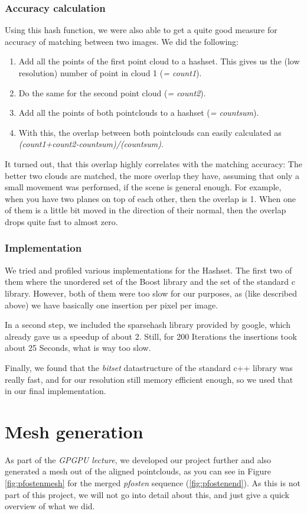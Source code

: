 \documentclass[10pt,twocolumn,letterpaper]{article}
\begin{document}
\subsubsection{Accuracy calculation}
Using this hash function, we were also able to get a quite good measure for accuracy of matching between two images. We did the following:
\begin{enumerate}
\item Add all the points of the first point cloud to a hashset. This gives us the (low resolution) number of point in cloud 1 (\textit{= count1}).
\item Do the same for the second point cloud (\textit{= count2}).
\item Add all the points of both pointclouds to a hashset (\textit{= countsum}).
\item With this, the overlap between both pointclouds can easily calculated as \textit{(count1+count2-countsum)/(countsum)}.
\end{enumerate}
It turned out, that this overlap highly correlates with the matching accuracy: The better two clouds are matched, the more overlap they have, assuming
that only a small movement was performed, if the scene is general enough. For example, when you have two planes on top of each other, then the overlap
is 1. When one of them is a little bit moved in the direction of their normal, then the overlap drops quite fast to almost zero.

\subsubsection{Implementation}
We tried and profiled various implementations for the Hashset. The first two of them where the unordered set of the Boost library and the set of the
standard c library. However, both of them were too slow for our purposes, as (like described above) we have basically one insertion per pixel per image.

In a second step, we included the sparsehash library provided by google, which already gave us a speedup of about 2. Still, for 200 Iterations the
insertions took about 25 Seconds, what is way too slow.

Finally, we found that the \textit{bitset} datastructure of the standard c++ library was really fast, and for our resolution still memory efficient enough,
so we used that in our final implementation.

\section{Mesh generation}
As part of the \textit{GPGPU lecture}, we developed our project further and also generated a mesh out of the aligned pointclouds, as you can see in
Figure \ref{fig:pfostenmesh} for the merged \textit{pfosten} sequence (\ref{fig:pfostenend}).
As this is not part of this project, we will not go into detail about this, and just give a quick overview of what we did.
\end{document}

